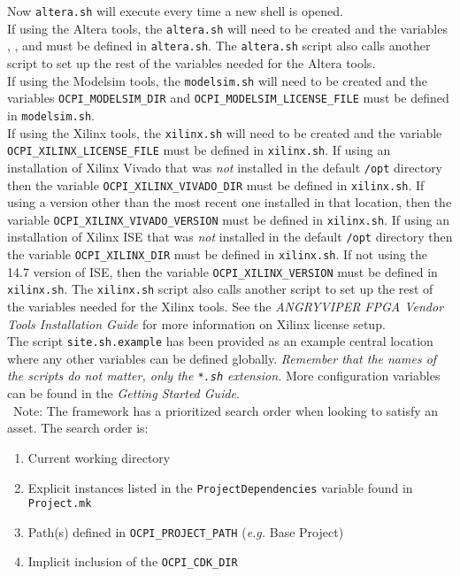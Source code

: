 Now \verb+altera.sh+ will execute every time a new shell is opened.\\

If using the Altera tools, the \verb+altera.sh+ will need to be created and the variables , , and  must be defined in \verb+altera.sh+. The \verb+altera.sh+ script also calls another script to set up the rest of the variables needed for the Altera tools.\\

If using the Modelsim tools, the \verb+modelsim.sh+ will need to be created and the variables \verb+OCPI_MODELSIM_DIR+ and \verb+OCPI_MODELSIM_LICENSE_FILE+ must be defined in \verb+modelsim.sh+.\\

If using the Xilinx tools, the \verb+xilinx.sh+ will need to be created and the variable \verb+OCPI_XILINX_LICENSE_FILE+ must be defined in \verb+xilinx.sh+. If using an installation of Xilinx Vivado that was \textit{not} installed in the default \verb+/opt+ directory then the variable \verb+OCPI_XILINX_VIVADO_DIR+ must be defined in \verb+xilinx.sh+. If using a version other than the most recent one installed in that location, then the variable \verb+OCPI_XILINX_VIVADO_VERSION+ must be defined in \verb+xilinx.sh+. If using an installation of Xilinx ISE that was \textit{not} installed in the default \verb+/opt+ directory then the variable \verb+OCPI_XILINX_DIR+ must be defined in \verb+xilinx.sh+. If not using the 14.7 version of ISE, then the variable \verb+OCPI_XILINX_VERSION+ must be defined in \verb+xilinx.sh+. The \verb+xilinx.sh+ script also calls another script to set up the rest of the variables needed for the Xilinx tools. See the \textit{ANGRYVIPER FPGA Vendor Tools Installation Guide} for more information on Xilinx license setup.\\

The script \verb+site.sh.example+ has been provided as an example central location where any other variables can be defined globally. \textit{Remember that the names of the scripts do not matter, only the \texttt{*.sh} extension.} More configuration variables can be found in the \textit{Getting Started Guide}.\\

\textbullet\ Note: The framework has a prioritized search order when looking to satisfy an asset. The search order is:
\begin{enumerate}
\item Current working directory
\item Explicit instances listed in the \verb+ProjectDependencies+ variable found in \verb+Project.mk+
\item Path(s) defined in \verb+OCPI_PROJECT_PATH+ (\textit{e.g.} Base Project)
\item Implicit inclusion of the \verb+OCPI_CDK_DIR+
\end{enumerate}

